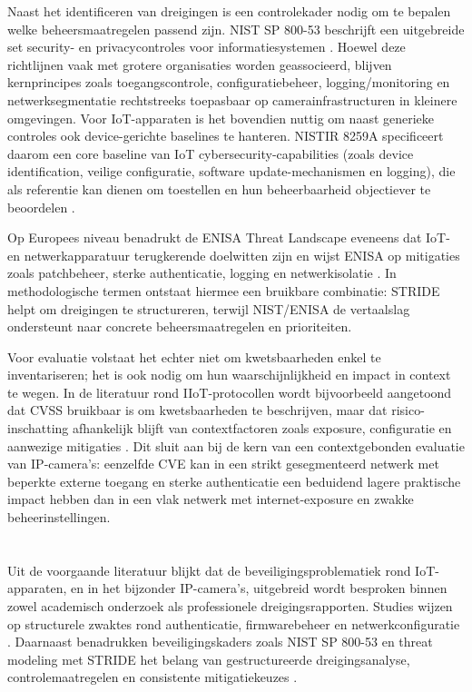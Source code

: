 Naast het identificeren van dreigingen is een controlekader nodig om te bepalen welke beheersmaatregelen passend zijn. NIST SP 800-53 beschrijft een uitgebreide set security- en privacycontroles voor informatiesystemen \autocite{NISTSP80053r5}. Hoewel deze richtlijnen vaak met grotere organisaties worden geassocieerd, blijven kernprincipes zoals toegangscontrole, configuratiebeheer, logging/monitoring en netwerksegmentatie rechtstreeks toepasbaar op camerainfrastructuren in kleinere omgevingen. Voor IoT-apparaten is het bovendien nuttig om naast generieke controles ook device-gerichte baselines te hanteren. NISTIR 8259A specificeert daarom een core baseline van IoT cybersecurity-capabilities (zoals device identification, veilige configuratie, software update-mechanismen en logging), die als referentie kan dienen om toestellen en hun beheerbaarheid objectiever te beoordelen \autocite{fagan2020iot}.

Op Europees niveau benadrukt de ENISA Threat Landscape eveneens dat IoT- en netwerkapparatuur terugkerende doelwitten zijn en wijst ENISA op mitigaties zoals patchbeheer, sterke authenticatie, logging en netwerkisolatie \autocite{ENISA2024ThreatLandscape}. In methodologische termen ontstaat hiermee een bruikbare combinatie: STRIDE helpt om dreigingen te structureren, terwijl NIST/ENISA de vertaalslag ondersteunt naar concrete beheersmaatregelen en prioriteiten.

Voor evaluatie volstaat het echter niet om kwetsbaarheden enkel te inventariseren; het is ook nodig om hun waarschijnlijkheid en impact in context te wegen. In de literatuur rond IIoT-protocollen wordt bijvoorbeeld aangetoond dat CVSS bruikbaar is om kwetsbaarheden te beschrijven, maar dat risico-inschatting afhankelijk blijft van contextfactoren zoals exposure, configuratie en aanwezige mitigaties \autocite{figueroa2020survey}. Dit sluit aan bij de kern van een contextgebonden evaluatie van IP-camera’s: eenzelfde CVE kan in een strikt gesegmenteerd netwerk met beperkte externe toegang en sterke authenticatie een beduidend lagere praktische impact hebben dan in een vlak netwerk met internet-exposure en zwakke beheerinstellingen.

\section{}%
\label{sec:onderzoekslacune}

Uit de voorgaande literatuur blijkt dat de beveiligingsproblematiek rond IoT-apparaten, en in het bijzonder IP-camera’s, uitgebreid wordt besproken binnen zowel academisch onderzoek als professionele dreigingsrapporten. Studies wijzen op structurele zwaktes rond authenticatie, firmwarebeheer en netwerkconfiguratie \autocite{Butun2019arXivIoTSecurity,ENISA2024ThreatLandscape}. Daarnaast benadrukken beveiligingskaders zoals NIST SP 800-53 en threat modeling met STRIDE het belang van gestructureerde dreigingsanalyse, controlemaatregelen en consistente mitigatiekeuzes \autocite{NISTSP80053r5,Microsoft2022bSTRIDE}.

